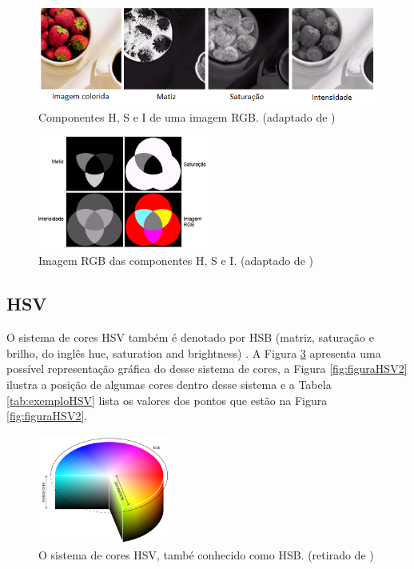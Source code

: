 \documentclass[	12pt, Times, openright, twoside, a4paper, english, brazil]{abntex2}
\begin{document}
\begin{figure}[!htb]
\centering \includegraphics[width=\textwidth]{figuraComponentesHSI.png}
\caption{Componentes H, S e I de uma imagem RGB. (adaptado de ) \label{fig:figuraComponentesHSI}}
\end{figure}

\begin{figure}[!htb]
\centering \includegraphics[width=0.5\textwidth]{figuraComponentesHSI2.png}
\caption{Imagem RGB das componentes H, S e I. (adaptado de ) \label{fig:figuraComponentesHSI2}}
\end{figure}

\subsection{HSV}

O sistema de cores HSV também é denotado por HSB (matriz, saturação e brilho, do inglês hue, saturation and brightness) \cite{burger2009digital}. A Figura \ref{fig:figuraHSV} apresenta uma possível representação gráfica do desse sistema de cores, a Figura \ref{fig:figuraHSV2} ilustra a posição de algumas cores dentro desse sistema e a Tabela \ref{tab:exemploHSV} lista os valores dos pontos que estão na Figura \ref{fig:figuraHSV2}.

\begin{figure}[!htb]
\centering \includegraphics[width=0.4\textwidth]{figuraHSV.png}
\caption{O sistema de cores HSV, també conhecido como HSB. (retirado de ) \label{fig:figuraHSV}}
\end{figure}
\end{document}
